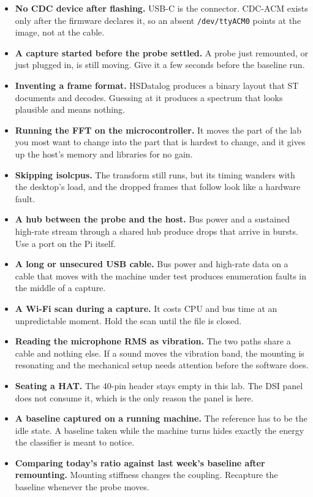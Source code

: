 \begin{itemize}
\item \textbf{No CDC device after flashing.} USB-C is the connector. CDC-ACM exists only after the firmware declares it, so an absent \texttt{/dev/ttyACM0} points at the image, not at the cable.
\item \textbf{A capture started before the probe settled.} A probe just remounted, or just plugged in, is still moving. Give it a few seconds before the baseline run.
\item \textbf{Inventing a frame format.} HSDatalog produces a binary layout that ST documents and decodes. Guessing at it produces a spectrum that looks plausible and means nothing.
\item \textbf{Running the FFT on the microcontroller.} It moves the part of the lab you most want to change into the part that is hardest to change, and it gives up the host's memory and libraries for no gain.
\item \textbf{Skipping isolcpus.} The transform still runs, but its timing wanders with the desktop's load, and the dropped frames that follow look like a hardware fault.
\item \textbf{A hub between the probe and the host.} Bus power and a sustained high-rate stream through a shared hub produce drops that arrive in bursts. Use a port on the Pi itself.
\item \textbf{A long or unsecured USB cable.} Bus power and high-rate data on a cable that moves with the machine under test produces enumeration faults in the middle of a capture.
\item \textbf{A Wi-Fi scan during a capture.} It costs CPU and bus time at an unpredictable moment. Hold the scan until the file is closed.
\item \textbf{Reading the microphone RMS as vibration.} The two paths share a cable and nothing else. If a sound moves the vibration band, the mounting is resonating and the mechanical setup needs attention before the software does.
\item \textbf{Seating a HAT.} The 40-pin header stays empty in this lab. The DSI panel does not consume it, which is the only reason the panel is here.
\item \textbf{A baseline captured on a running machine.} The reference has to be the idle state. A baseline taken while the machine turns hides exactly the energy the classifier is meant to notice.
\item \textbf{Comparing today's ratio against last week's baseline after remounting.} Mounting stiffness changes the coupling. Recapture the baseline whenever the probe moves.

\end{itemize}

